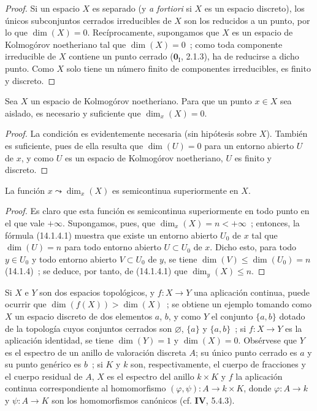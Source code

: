 \begin{proof}
Si un espacio $X$ es separado (y \emph{a fortiori} si $X$ es un espacio
discreto), los únicos subconjuntos cerrados irreducibles de $X$ son los
reducidos a un punto, por lo que $\dim(X)=0$. Recíprocamente, supongamos que
$X$ es un espacio de Kolmogórov noetheriano tal que $\dim(X)=0$~; como toda
componente irreducible de $X$ contiene un punto cerrado ($\mathbf{0}_{\mathrm I}$, 2.1.3),
ha de reducirse a dicho punto. Como $X$ solo tiene un número finito de
componentes irreducibles, es finito y discreto.
\end{proof}

\begin{corollary}[14.1.10]
\label{0.14.1.10-es}
Sea $X$ un espacio de Kolmogórov noetheriano. Para que un punto $x\in X$ sea
aislado, es necesario y suficiente que $\dim_x(X)=0$.
\end{corollary}

\begin{proof}
La condición es evidentemente necesaria (sin hipótesis sobre $X$). También es
suficiente,
pues de ella resulta que $\dim(U)=0$ para un entorno abierto $U$ de $x$, y
como $U$ es un espacio de Kolmogórov noetheriano, $U$ es finito y discreto.
\end{proof}

\begin{proposition}[14.1.11]
\label{0.14.1.11-es}
La función $x\leadsto\dim_x(X)$ es semicontinua superiormente en $X$.
\end{proposition}

\begin{proof}
Es claro que esta función es semicontinua superiormente en todo
punto en el que vale $+\infty$. Supongamos, pues, que $\dim_x(X)=n<+\infty$~;
entonces, la fórmula (14.1.4.1) muestra que existe un entorno abierto $U_0$ de
$x$ tal que $\dim(U)=n$ para todo entorno abierto $U\subset U_0$ de $x$.
Dicho esto, para todo $y\in U_0$ y todo entorno abierto $V\subset U_0$ de $y$,
se tiene $\dim(V)\leq\dim(U_0)=n$ (14.1.4)~; se deduce, por tanto, de
(14.1.4.1) que $\dim_y(X)\leq n$.
\end{proof}

\begin{remark}[14.1.12]
\label{0.14.1.12-es}
Si $X$ e $Y$ son dos espacios topológicos, y $f:X\to Y$ una aplicación
continua, puede ocurrir que $\dim(f(X))>\dim(X)$~; se obtiene un ejemplo tomando
como $X$ un espacio discreto de dos elementos $a$, $b$, y como $Y$ el conjunto
$\{a,b\}$ dotado de la topología cuyos conjuntos cerrados son
$\varnothing$, $\{a\}$ y $\{a,b\}$~; si $f:X\to Y$ es la aplicación
identidad, se tiene $\dim(Y)=1$ y $\dim(X)=0$. Obsérvese que $Y$ es el espectro
de un anillo de valoración discreta $A$; su único punto cerrado es $a$ y su
punto genérico es $b$~; si $K$ y $k$ son, respectivamente, el cuerpo de
fracciones y el cuerpo residual de $A$, $X$ es el espectro del anillo $k\times K$
y $f$ la aplicación continua correspondiente al homomorfismo
$(\varphi,\psi):A\to k\times K$, donde $\varphi:A\to k$ y $\psi:A\to K$ son
los homomorfismos canónicos (cf. \textbf{IV}, 5.4.3).
\end{remark}

